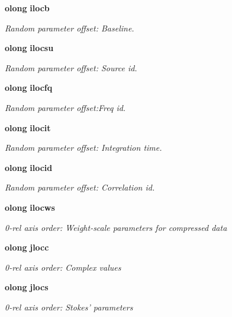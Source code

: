 \begin{CompactItemize}
{\bf olong} {\bf ilocb}
\begin{CompactList}\small\item\em Random parameter offset: Baseline. \item\end{CompactList}\item 
{\bf olong} {\bf ilocsu}
\begin{CompactList}\small\item\em Random parameter offset: Source id. \item\end{CompactList}\item 
{\bf olong} {\bf ilocfq}
\begin{CompactList}\small\item\em Random parameter offset:Freq id. \item\end{CompactList}\item 
{\bf olong} {\bf ilocit}
\begin{CompactList}\small\item\em Random parameter offset: Integration time. \item\end{CompactList}\item 
{\bf olong} {\bf ilocid}
\begin{CompactList}\small\item\em Random parameter offset: Correlation id. \item\end{CompactList}\item 
{\bf olong} {\bf ilocws}
\begin{CompactList}\small\item\em 0-rel axis order: Weight-scale parameters for compressed data \item\end{CompactList}\item 
{\bf olong} {\bf jlocc}
\begin{CompactList}\small\item\em 0-rel axis order: Complex values \item\end{CompactList}\item 
{\bf olong} {\bf jlocs}
\begin{CompactList}\small\item\em 0-rel axis order: Stokes' parameters \item\end{CompactList}\item 

\end{CompactItemize}
